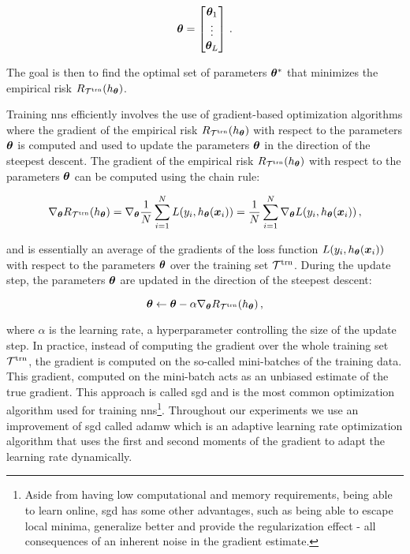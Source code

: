\begin{equation}
    {\ensuremath{\boldsymbol{\theta}}} = \begin{bmatrix}
        {\ensuremath{\boldsymbol{\theta}}}_1 \\
        \vdots      \\
        {\boldsymbol{\theta}}_L
    \end{bmatrix}\,.
\end{equation}

The goal is then to find the optimal set of parameters ${\boldsymbol{\theta}}^*$ that minimizes the empirical risk $R_{\mathcal{T}^\text{trn}}(h_{{\boldsymbol{\theta}}})$.

Training \glspl{nn} efficiently involves the use of gradient-based optimization algorithms where the gradient of the
empirical risk $R_{\mathcal{T}^\text{trn}}(h_{{\boldsymbol{\theta}}})$ with respect to the parameters ${\boldsymbol{\theta}}$ is computed and used to update the parameters
${\boldsymbol{\theta}}$ in the direction of the steepest descent. The gradient of the empirical risk $R_{\mathcal{T}^\text{trn}}(h_{{\boldsymbol{\theta}}})$ with respect to
the parameters ${\boldsymbol{\theta}}$ can be computed using the chain rule:

\begin{equation}
    \nabla_{{\boldsymbol{\theta}}} R_{\mathcal{T}^\text{trn}}(h_{{\boldsymbol{\theta}}}) = \nabla_{{\boldsymbol{\theta}}} \frac{1}{N} \sum_{i=1}^{N} L(y_i, h_{{\boldsymbol{\theta}}}(\bm{x}_i)) = \frac{1}{N} \sum_{i=1}^{N} \nabla_{{\boldsymbol{\theta}}} L(y_i, h_{{\boldsymbol{\theta}}}(\bm{x}_i))\,,
\end{equation}

and is essentially an average of the gradients of the loss function $L(y_i, h_{{\boldsymbol{\theta}}}(\bm{x}_i))$ with respect to the
parameters ${\boldsymbol{\theta}}$ over the training set ${\mathcal{T}^\text{trn}}$. During the update step, the parameters ${\boldsymbol{\theta}}$ are updated in the
direction of the steepest descent:

\begin{equation}
    {\ensuremath{\boldsymbol{\theta}}} \leftarrow {\ensuremath{\boldsymbol{\theta}}} - \alpha \nabla_{{\boldsymbol{\theta}}} R_{\mathcal{T}^\text{trn}}(h_{{\boldsymbol{\theta}}})\,,
\end{equation}

where $\alpha$ is the learning rate, a hyperparameter controlling the size of the update step. In practice,
instead of computing the gradient over the whole training set ${\mathcal{T}^\text{trn}}$, the gradient is computed on the so-called
mini-batches of the training data. This gradient, computed on the mini-batch acts as an unbiased estimate of the true
gradient. This approach is called \gls{sgd} and is the most common optimization algorithm used for training
\glspl{nn}\footnote{Aside from having low computational and
    memory requirements, being able to learn online, \gls{sgd} has some other advantages, such as being able to escape
    local minima, generalize better and provide the regularization effect - all consequences of an inherent noise in the
    gradient estimate.}.
Throughout our experiments we use an improvement of \gls{sgd} called \gls{adamw} \cite{adam, adamw} which is an adaptive
learning rate optimization algorithm that uses the first and second moments of the gradient to adapt the learning rate
dynamically.

